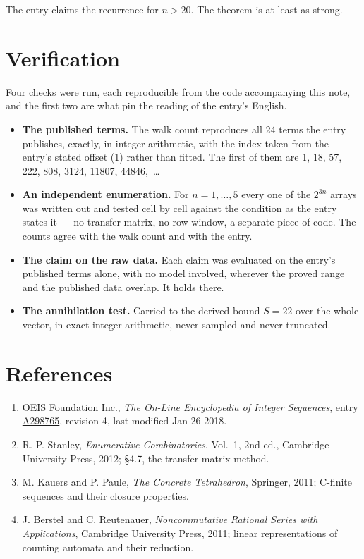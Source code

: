 \documentclass[11pt]{article}
\theoremstyle{definition}
\begin{document}
The entry claims the recurrence for $n > 20$. The theorem is at least as strong.

\section{Verification}

Four checks were run, each reproducible from the code accompanying this note, and the first two are what pin the reading of the entry's English.

\begin{itemize}

\item {\bfseries The published terms.} The walk count reproduces all 24 terms the entry publishes, exactly, in integer arithmetic, with the index taken from the entry's stated offset (1) rather than fitted. The first of them are 1, 18, 57, 222, 808, 3124, 11807, 44846,~\dots

\item {\bfseries An independent enumeration.} For $n = 1,\dots,5$ every one of the $2^{3n}$ arrays was written out and tested cell by cell against the condition as the entry states it --- no transfer matrix, no row window, a separate piece of code. The counts agree with the walk count and with the entry.

\item {\bfseries The claim on the raw data.} Each claim was evaluated on the entry's published terms alone, with no model involved, wherever the proved range and the published data overlap. It holds there.

\item {\bfseries The annihilation test.} Carried to the derived bound $S = 22$ over the whole vector, in exact integer arithmetic, never sampled and never truncated.

\end{itemize}

\section{References}

\begin{enumerate}

\item OEIS Foundation Inc., \emph{The On-Line Encyclopedia of Integer Sequences}, entry \href{https://oeis.org/A298765}{A298765}, revision 4, last modified Jan 26 2018.

\item R. P. Stanley, \emph{Enumerative Combinatorics}, Vol.~1, 2nd ed., Cambridge University Press, 2012; \S4.7, the transfer-matrix method.

\item M. Kauers and P. Paule, \emph{The Concrete Tetrahedron}, Springer, 2011; C-finite sequences and their closure properties.

\item J. Berstel and C. Reutenauer, \emph{Noncommutative Rational Series with Applications}, Cambridge University Press, 2011; linear representations of counting automata and their reduction.

\end{enumerate}
\end{document}
